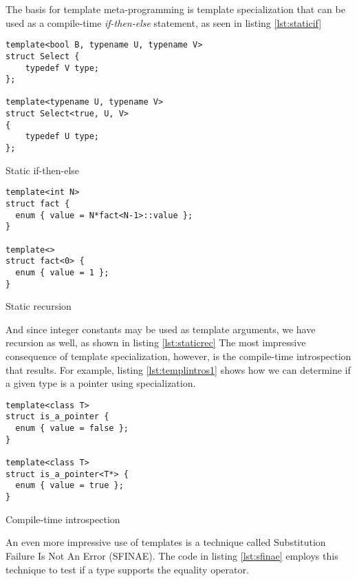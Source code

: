 The basis for template meta-programming is template specialization that can be used as a compile-time \emph{if-then-else} statement, as seen in listing \ref{lst:staticif}

\begin{listing}[H]
\begin{verbatim}
template<bool B, typename U, typename V>
struct Select {
	typedef V type;
};

template<typename U, typename V>
struct Select<true, U, V>
{
	typedef U type;
};
\end{verbatim}
\caption{Static if-then-else}
\label{lst:staticif}
\end{listing}
\begin{listing}[H]
\begin{verbatim}
template<int N>
struct fact {
  enum { value = N*fact<N-1>::value };
}

template<>
struct fact<0> {
  enum { value = 1 };
}
\end{verbatim}
\caption{Static recursion}
\label{lst:staticrec}
\end{listing}

And since integer constants may be used as template arguments, we have recursion as well, as shown in listing \ref{lst:staticrec}
The most impressive consequence of template specialization, however, is the compile-time introspection that results. For example,
listing \ref{lst:templintros1} shows how we can determine if a given type is a pointer using specialization.

\begin{listing}[H]
\begin{verbatim}
template<class T>
struct is_a_pointer {
  enum { value = false };
}

template<class T>
struct is_a_pointer<T*> {
  enum { value = true };
}
\end{verbatim}
\caption{Compile-time introspection}
\label{lst:templintros1}
\end{listing}

An even more impressive use of templates is a technique called Substitution Failure Is Not An Error (SFINAE).
The code in listing \ref{lst:sfinae} employs this technique to test if a type supports the equality operator.

